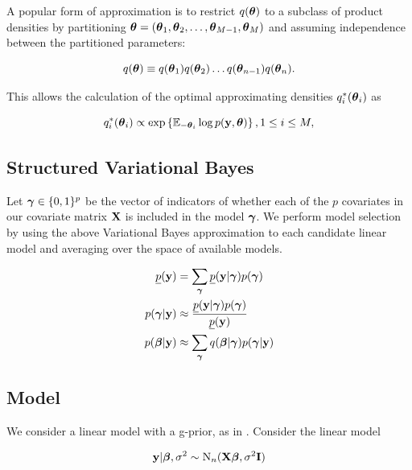 \documentclass{amsart}[12pt]
\begin{document}
A popular form of approximation is to restrict $q({\boldsymbol \theta})$ to a subclass of product densities by partitioning
${\boldsymbol \theta} = ({\boldsymbol \theta}_1, {\boldsymbol \theta}_2, \ldots, {\boldsymbol \theta}_{M-1}, {\boldsymbol \theta}_M)$ and assuming independence between the
partitioned parameters:

\begin{equation*}
	q({\boldsymbol \theta}) \equiv q({\boldsymbol \theta}_1) q({\boldsymbol \theta}_2) \ldots q({\boldsymbol \theta}_{n-1}) q({\boldsymbol \theta}_n).
\end{equation*}

This allows the calculation of the optimal approximating densities $q_i^*({\boldsymbol \theta}_i)$ as

\begin{equation*}
	q_i^*({\boldsymbol \theta}_i) \propto \exp \left \{ \mathbb{E}_{-{\boldsymbol \theta}_i} \log p({\bf y}, {\boldsymbol \theta}) \right \}, 1 \leq i \leq M,
\end{equation*}

\subsection{Structured Variational Bayes}

Let ${\boldsymbol \gamma} \in \{0, 1\}^p$ be the vector of indicators of whether each of the $p$ covariates in our
covariate matrix ${\bf X}$ is included in the model ${\boldsymbol \gamma}$. We perform model selection by using the above
Variational Bayes approximation to each  candidate linear model and averaging over the space of available
models.

\begin{align*}
	\underline{p}({\bf y}) & = \sum_{\boldsymbol \gamma} \underline{p}({\bf y}|{\boldsymbol \gamma}) p({\boldsymbol \gamma})                     \\
	p({\boldsymbol \gamma}|{\bf y})     & \approx \frac{\underline{p}({\bf y}|{\boldsymbol \gamma}) p({\boldsymbol \gamma})}{\underline{p}({\bf y})} \\
	p({\boldsymbol \beta}|{\bf y})      & \approx \sum_{\boldsymbol \gamma} q({\boldsymbol \beta}|{\boldsymbol \gamma}) p({\boldsymbol \gamma}|{\bf y})                    \\
\end{align*}

\subsection{Model}
\label{sec:model}

We consider a linear model with a g-prior, as in \cite{Liang2008}. Consider the linear model

\begin{align*}
	{\bf y} | {\boldsymbol \beta}, \sigma^2 \sim \text{N}_n({\bf X} {\boldsymbol \beta}, \sigma^2 {\bf I}) 
\end{align*}
\end{document}
